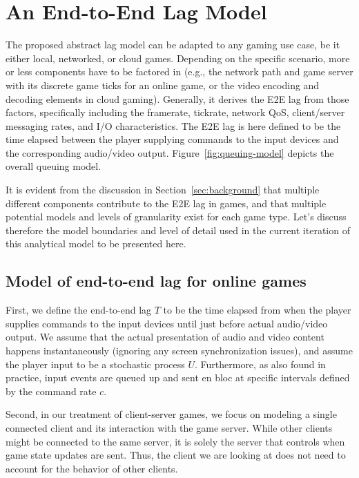 \section{An End-to-End Lag Model}
\label{sec:model}

The proposed abstract lag model can be adapted to any gaming use case, be it either local, networked, or cloud games. Depending on the specific scenario, more or less components have to be factored in (e.g., the network path and game server with its discrete game ticks for an online game, or the video encoding and decoding elements in cloud gaming). Generally, it derives the \gls{E2E} lag from those factors, specifically including the framerate, tickrate, network \gls{QoS}, client/server messaging rates, and I/O characteristics. The \gls{E2E} lag is here defined to be the time elapsed between the player supplying commands to the input devices and the corresponding audio/video output. Figure~\ref{fig:queuing-model} depicts the overall queuing model.






It is evident from the discussion in Section~\ref{sec:background} that multiple different components contribute to the \gls{E2E} lag in games, and that multiple potential models and levels of granularity exist for each game type. Let's discuss therefore the model boundaries and level of detail used in the current iteration of this analytical model to be presented here.


\subsection{Model of end-to-end lag for online games}
First, we define the end-to-end lag $T$ to be the time elapsed from when the player supplies commands to the input devices until just before actual audio/video output. We assume that the actual presentation of audio and video content happens instantaneously (ignoring any screen synchronization issues), and assume the player input to be a stochastic process $U$. Furthermore, as also found in practice, input events are queued up and sent en bloc at specific intervals defined by the command rate $c$.

Second, in our treatment of client-server games, we focus on modeling a single connected client and its interaction with the game server. While other clients might be connected to the same server, it is solely the server that controls when game state updates are sent. Thus, the client we are looking at does not need to account for the behavior of other clients.

